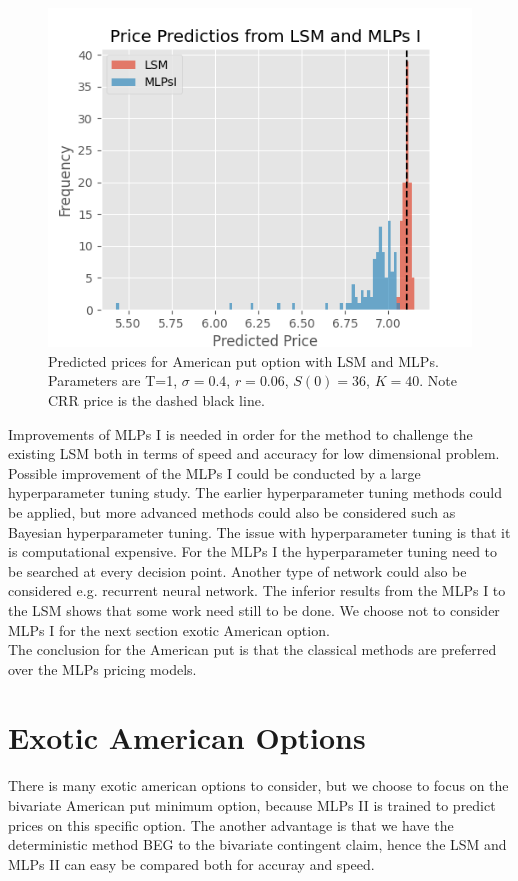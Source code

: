 \begin{figure}[th]
\centering
\includegraphics{Figures/histLSMMLPsI.png}
\decoRule
\caption[Histogram Price Predictions]{Predicted prices for American put option with LSM and MLPs. Parameters are T=1, $\sigma=0.4$, $r=0.06$, $S(0)=36$, $K=40$. Note CRR price is the dashed black line.}
\label{fig:histLSMMLPsI}
\end{figure}

Improvements of MLPs I is needed in order for the method to challenge the existing LSM both in terms of speed and accuracy for low dimensional problem. Possible improvement of the MLPs I could be conducted by a large hyperparameter tuning study. The earlier hyperparameter tuning methods could be applied, but more advanced methods could also be considered such as Bayesian hyperparameter tuning. The issue with hyperparameter tuning is that it is computational expensive. For the MLPs I the hyperparameter tuning need to be searched at every decision point. Another type of network could also be considered e.g. recurrent neural network. The inferior results from the MLPs I to the LSM shows that some work need still to be done. We choose not to consider MLPs I for the next section exotic American option.\\

The conclusion for the American put is that the classical methods are preferred over the MLPs pricing models.

\section{Exotic American Options}
There is many exotic american options to consider, but we choose to focus on the bivariate American put minimum option, because MLPs II is trained to predict prices on this specific option. The another advantage is that we have the deterministic method BEG to the bivariate contingent claim, hence the LSM and MLPs II can easy be compared both for accuray and speed.\\

